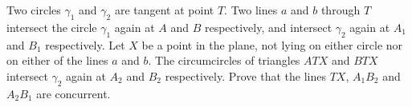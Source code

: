 \problem{}
Two circles $\gamma_1$ and $\gamma_2$ are tangent at point $T$.
Two lines $a$ and $b$ through $T$ intersect the circle $\gamma_1$ again at $A$ and $B$
respectively, and intersect $\gamma_2$ again at $A_1$ and $B_1$ respectively.
Let $X$ be a point in the plane, not lying on either circle nor on either of the lines
$a$ and $b$.
The circumcircles of triangles $ATX$ and $BTX$ intersect $\gamma_2$ again at $A_2$ and
$B_2$ respectively.
Prove that the lines $TX$, $A_1 B_2$ and $A_2 B_1$ are concurrent.
\solution
\endproblem
